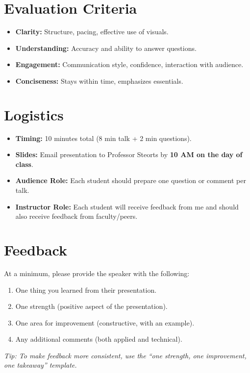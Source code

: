 \documentclass[11pt]{article}
\begin{document}
\section*{Evaluation Criteria}
\begin{itemize}
    \item \textbf{Clarity:} Structure, pacing, effective use of visuals.
    \item \textbf{Understanding:} Accuracy and ability to answer questions.
    \item \textbf{Engagement:} Communication style, confidence, interaction with audience.
    \item \textbf{Conciseness:} Stays within time, emphasizes essentials.
\end{itemize}

\section*{Logistics}
\begin{itemize}
    \item \textbf{Timing:} 10 minutes total (8 min talk + 2 min questions).
    \item \textbf{Slides:} Email presentation to Professor Steorts by \textbf{10 AM on the day of class}.
    \item \textbf{Audience Role:} Each student should prepare one question or comment per talk.
    \item \textbf{Instructor Role:} Each student will receive feedback from me and should also receive feedback from faculty/peers.
\end{itemize}

\section*{Feedback}
At a minimum, please provide the speaker with the following:
\begin{enumerate}
    \item One thing you learned from their presentation.
    \item One strength (positive aspect of the presentation).
    \item One area for improvement (constructive, with an example).
    \item Any additional comments (both applied and technical).
\end{enumerate}

\textit{Tip: To make feedback more consistent, use the ``one strength, one improvement, one takeaway'' template.}
\end{document}
